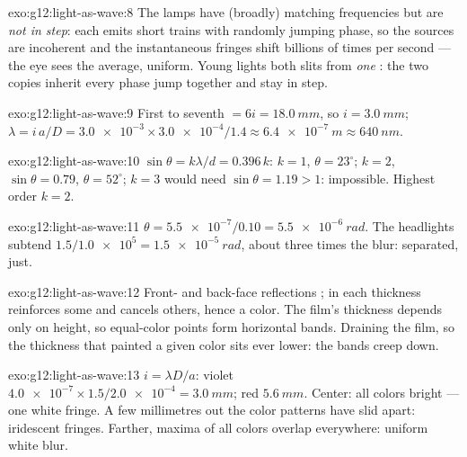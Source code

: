 \begin{solution}{exo:g12:light-as-wave:8}
The lamps have (broadly) matching frequencies but are \emph{not in
step}: each emits short  trains with randomly jumping phase, so
the sources are incoherent and the instantaneous fringes shift
billions of times per second --- the eye sees the average, uniform.
Young lights both slits from \emph{one} : the two copies inherit
every phase jump together and stay in step.
\end{solution}

\begin{solution}{exo:g12:light-as-wave:9}
First to seventh $= 6i = \qty{18.0}{mm}$, so $i = \qty{3.0}{mm}$;
$\lambda = i\,a/D = \num{3.0e-3} \times \num{3.0e-4}/1.4 \approx
\qty{6.4e-7}{m} \approx \qty{640}{nm}$.
\end{solution}

\begin{solution}{exo:g12:light-as-wave:10}
$\sin\theta = k\lambda/d = 0.396\,k$: $k = 1$, $\theta = 23^\circ$;
$k = 2$, $\sin\theta = 0.79$, $\theta = 52^\circ$; $k = 3$ would need
$\sin\theta = 1.19 > 1$: impossible. Highest order $k = 2$.
\end{solution}

\begin{solution}{exo:g12:light-as-wave:11}
$\theta = \num{5.5e-7}/0.10 = \qty{5.5e-6}{rad}$. The headlights
subtend $1.5/\num{1.0e5} = \qty{1.5e-5}{rad}$, about three times the
blur: separated, just.
\end{solution}

\begin{solution}{exo:g12:light-as-wave:12}
Front- and back-face reflections ; in  each
thickness reinforces some  and cancels others, hence a
color. The film's thickness depends only on height, so equal-color
points form horizontal bands. Draining  the film, so the
thickness that painted a given color sits ever lower: the bands
creep down.
\end{solution}

\begin{solution}{exo:g12:light-as-wave:13}
$i = \lambda D/a$: violet $\num{4.0e-7} \times 1.5/\num{2.0e-4} =
\qty{3.0}{mm}$; red $\qty{5.6}{mm}$. Center: all colors bright ---
one white fringe. A few millimetres out the color patterns have
slid apart: iridescent fringes. Farther, maxima of all colors
overlap everywhere: uniform white blur.
\end{solution}


